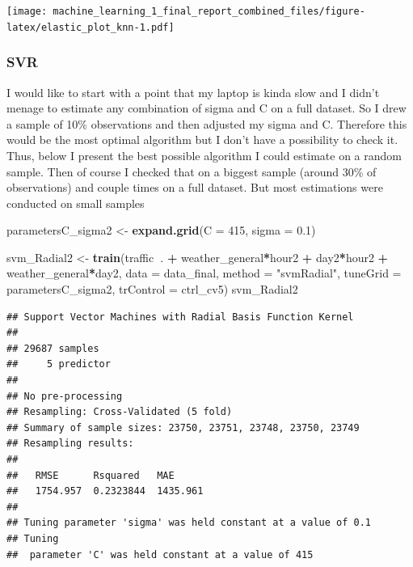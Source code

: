 \documentclass[
]{article}
\newenvironment{Shaded}{\begin{snugshade}}{\end{snugshade}}
\newcommand{\DataTypeTok}[1]{\textcolor[rgb]{0.13,0.29,0.53}{#1}}
\newcommand{\DecValTok}[1]{\textcolor[rgb]{0.00,0.00,0.81}{#1}}
\newcommand{\FloatTok}[1]{\textcolor[rgb]{0.00,0.00,0.81}{#1}}
\newcommand{\KeywordTok}[1]{\textcolor[rgb]{0.13,0.29,0.53}{\textbf{#1}}}
\newcommand{\NormalTok}[1]{#1}
\newcommand{\OperatorTok}[1]{\textcolor[rgb]{0.81,0.36,0.00}{\textbf{#1}}}
\newcommand{\StringTok}[1]{\textcolor[rgb]{0.31,0.60,0.02}{#1}}
\begin{document}
\texttt{[image: machine\_learning\_1\_final\_report\_combined\_files/figure-latex/elastic\_plot\_knn-1.pdf]}

\hypertarget{svr}{%
\subsubsection{SVR}\label{svr}}

I would like to start with a point that my laptop is kinda slow and I
didn't menage to estimate any combination of sigma and C on a full
dataset. So I drew a sample of 10\% observations and then adjusted my
sigma and C. Therefore this would be the most optimal algorithm but I
don't have a possibility to check it. Thus, below I present the best
possible algorithm I could estimate on a random sample. Then of course I
checked that on a biggest sample (around 30\% of observations) and
couple times on a full dataset. But most estimations were conducted on
small samples

\begin{Shaded}
\begin{Highlighting}[]
\NormalTok{parametersC_sigma2 <-}\StringTok{ }
\StringTok{  }\KeywordTok{expand.grid}\NormalTok{(}\DataTypeTok{C =} \DecValTok{415}\NormalTok{,}
              \DataTypeTok{sigma =} \FloatTok{0.1}\NormalTok{)}


\NormalTok{svm_Radial2 <-}\StringTok{ }\KeywordTok{train}\NormalTok{(traffic}\OperatorTok{~}\NormalTok{. }\OperatorTok{+}\StringTok{ }\NormalTok{weather_general}\OperatorTok{*}\NormalTok{hour2  }\OperatorTok{+}\StringTok{ }\NormalTok{day2}\OperatorTok{*}\NormalTok{hour2 }\OperatorTok{+}\StringTok{ }\NormalTok{weather_general}\OperatorTok{*}\NormalTok{day2, }
                            \DataTypeTok{data =}\NormalTok{ data_final, }
                            \DataTypeTok{method =} \StringTok{"svmRadial"}\NormalTok{,}
                            \DataTypeTok{tuneGrid =}\NormalTok{ parametersC_sigma2,}
                            \DataTypeTok{trControl =}\NormalTok{ ctrl_cv5)}
\NormalTok{svm_Radial2}
\end{Highlighting}
\end{Shaded}

\begin{verbatim}
## Support Vector Machines with Radial Basis Function Kernel 
## 
## 29687 samples
##     5 predictor
## 
## No pre-processing
## Resampling: Cross-Validated (5 fold) 
## Summary of sample sizes: 23750, 23751, 23748, 23750, 23749 
## Resampling results:
## 
##   RMSE      Rsquared   MAE     
##   1754.957  0.2323844  1435.961
## 
## Tuning parameter 'sigma' was held constant at a value of 0.1
## Tuning
##  parameter 'C' was held constant at a value of 415
\end{verbatim}
\end{document}
